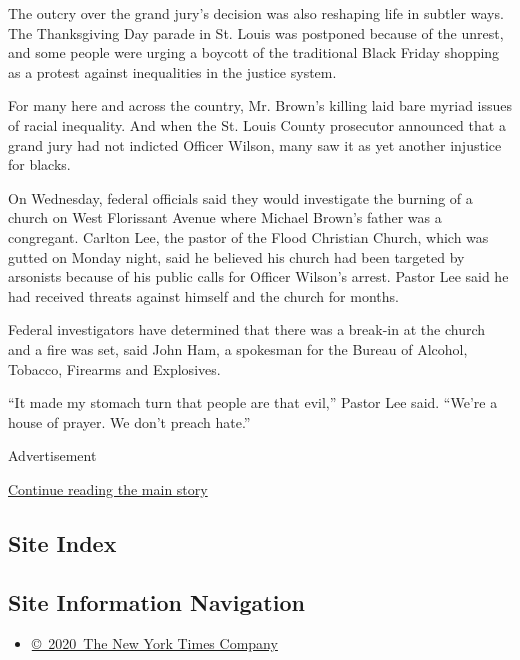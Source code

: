 The outcry over the grand jury's decision was also reshaping life in
subtler ways. The Thanksgiving Day parade in St. Louis was postponed
because of the unrest, and some people were urging a boycott of the
traditional Black Friday shopping as a protest against inequalities in
the justice system.

For many here and across the country, Mr. Brown's killing laid bare
myriad issues of racial inequality. And when the St. Louis County
prosecutor announced that a grand jury had not indicted Officer Wilson,
many saw it as yet another injustice for blacks.

On Wednesday, federal officials said they would investigate the burning
of a church on West Florissant Avenue where Michael Brown's father was a
congregant. Carlton Lee, the pastor of the Flood Christian Church, which
was gutted on Monday night, said he believed his church had been
targeted by arsonists because of his public calls for Officer Wilson's
arrest. Pastor Lee said he had received threats against himself and the
church for months.

Federal investigators have determined that there was a break-in at the
church and a fire was set, said John Ham, a spokesman for the Bureau of
Alcohol, Tobacco, Firearms and Explosives.

``It made my stomach turn that people are that evil,'' Pastor Lee said.
``We're a house of prayer. We don't preach hate.''

Advertisement

\protect\hyperlink{after-bottom}{Continue reading the main story}

\hypertarget{site-index}{%
\subsection{Site Index}\label{site-index}}

\hypertarget{site-information-navigation}{%
\subsection{Site Information
Navigation}\label{site-information-navigation}}

\begin{itemize}
\tightlist
\item
  \href{https://help.nytimes.com/hc/en-us/articles/115014792127-Copyright-notice}{©~2020~The
  New York Times Company}
\end{itemize}

